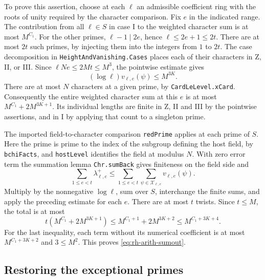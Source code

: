 To prove this assertion, choose at each \(\ell\) an admissible coefficient
ring with the roots of unity required by the character comparison.
Fix \(e\) in the indicated range. The contribution from all \(\ell\in S\)
in case I to the weighted character sum is at most \(M^{C_1}\).
For the other primes, \(\ell-1\mid2e\), hence
\(\ell\le 2e+1\le2t\). There are at most \(2t\) such primes, by
injecting them into the integers from \(1\) to \(2t\). The case
decomposition in \texttt{Height\allowbreak{}And\allowbreak{}Vanishing.\allowbreak{}Cases} places each of their
characters in Z, II, or III. Since \(\ell N e\le2Mt\le M^3\), the
pointwise estimate gives
\[
    (\log\ell)v_{\ell,e}(\psi)\le M^{3K}.
\]
There are at most \(N\) characters at a given prime, by
\texttt{Card\allowbreak{}Le\allowbreak{}Level.\allowbreak{}x\allowbreak{}Card}. Consequently the entire weighted character
sum at this \(e\) is at most \(M^{C_1}+2M^{3K+1}\).
Its individual lengths are finite in Z, II and III by the pointwise
assertions, and in I by applying that count to a singleton prime.

The imported field-to-character comparison \texttt{red\allowbreak{}Prime} applies at
each prime of \(S\). Here the prime is prime to the index of the
subgroup defining the host field, by \texttt{bchi\allowbreak{}Facts}, and
\texttt{host\allowbreak{}Level} identifies the field at modulus \(N\).
With zero error term the summation lemma \texttt{Chr.\allowbreak{}sum\allowbreak{}Back} gives
finiteness on the field side and
\[
     \sum_{1\le e<t}\lambda^+_{\ell,e}
        \le \sum_{1\le e<t}\sum_{\psi\in\mathcal X_{\ell,e}}
                                      v_{\ell,e}(\psi).
\]
Multiply by the nonnegative \(\log\ell\), sum over \(S\), interchange
the finite sums, and apply the preceding estimate for each \(e\).
There are at most \(t\) twists. Since \(t\le M\), the total is at most
\[
   t(M^{C_1}+2M^{3K+1})
   \le M^{C_1+1}+2M^{3K+2}
   \le M^{C_1+3K+4}.
\]
For the last inequality, each term without its numerical coefficient
is at most \(M^{C_1+3K+2}\) and \(3\le M^2\).
This proves \eqref{eq:rh-arith-sumout}.

\subsection{Restoring the exceptional primes}

